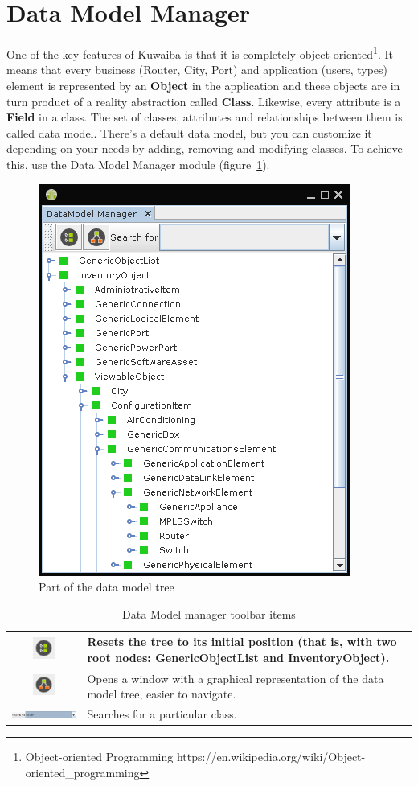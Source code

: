 \documentclass[a4paper]{article}
\begin{document}
	\section{Data Model Manager} \label{sec:data_model_manager}
		One of the key features of Kuwaiba is that it is completely object-oriented\footnote{Object-oriented Programming https://en.wikipedia.org/wiki/Object-oriented\_programming}. It means that every business (Router, City, Port) and application (users, types) element is represented by an \textbf{Object} in the application and these objects are in turn product of a reality abstraction called \textbf{Class}. Likewise, every attribute is a \textbf{Field} in a class. The set of classes, attributes and relationships between them is called data model. There's a default data model, but you can customize it depending on your needs by adding, removing and modifying classes. To achieve this, use the Data Model Manager module (figure~\ref{fig:data_model_manager}).
		\begin{figure}[h!]
			\centering
			\includegraphics[width=0.4\linewidth]{img/data_model_manager.png}
			\caption{Part of the data model tree}
			\label{fig:data_model_manager}
		\end{figure}
		\begin{table}[h!]
			\centering
			\begin{tabular}{cp{10cm}}
				\includegraphics[width=0.7cm]{img/icon_data_model_default_layout.png} & Resets the tree to its initial position (that is, with two root nodes: \textbf{GenericObjectList} and \textbf{InventoryObject}).\\
				\midrule
				\includegraphics[width=0.7cm]{img/icon_data_model_class_hierarchy_view.png} & Opens a window with a graphical representation of the data model tree,  easier to navigate.\\
				\midrule
				\includegraphics[width=5cm]{img/data_model_manager_search.png} & Searches for a particular class.\\
			\end{tabular}
			\caption{Data Model manager toolbar items}
			\label{tab:data_model_manager_toolbar_icons}
		\end{table}
\end{document}
